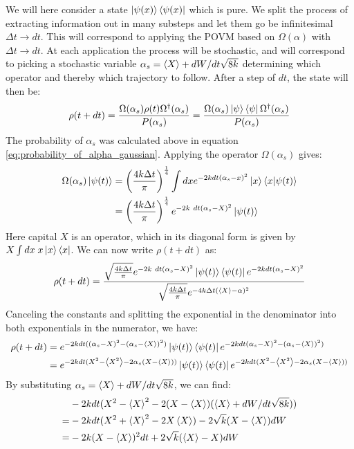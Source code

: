 We will here consider a state $\ket{\psi(x)}\bra{\psi(x)}$ which is pure. We split the process of extracting information out in many substeps and let them go be infinitesimal $\Delta t \to dt$. This will correspond to applying the POVM based on ${\Omega(\alpha)}$ with $\Delta t \to dt$. At each application the process will be stochastic, and will correspond to picking a stochastic variable $\alpha_s =\expval{X} + {dW}/{dt \sqrt{8k}}$ determining which operator and thereby which trajectory to follow. After a step of $dt$, the state will then be:
\begin{equation}
    \rho(t+dt) = \frac{\Omega(\alpha_s) \rho(t)  \Omega^\dagger(\alpha_s)}{P(\alpha_s)} = \frac{\Omega(\alpha_s) \ket{\psi}\bra{\psi}  \Omega^\dagger(\alpha_s)}{P(\alpha_s)} 
\end{equation}
The probability of $\alpha_s$ was calculated above in equation \ref{eq:probability_of_alpha_gaussian}. Applying the operator $\Omega(\alpha_s)$ gives:
\begin{align*}
    \Omega(\alpha_s)\ket{\psi(t)} &=  \left(\frac{4 k \Delta t}{\pi}\right)^\frac14\int dx e^{-2k dt (\alpha_s - x)^2} \ket{x}\bra{x} \ket{\psi(t)} \\
                                  &=  \left(\frac{4 k \Delta t}{\pi}\right)^\frac14 e^{-2k\ dt (\alpha_s - X)^2} \ket{\psi(t)}
\end{align*}
Here capital $X$ is an operator, which in its diagonal form is given by $X \int dx \;x \ket{x}\bra{x}$. We can now write $\rho(t+dt)$ as:
\begin{equation}
    \rho(t + dt) =\frac{\sqrt{\frac{4 k \Delta t}{\pi}}e^{-2k\ dt (\alpha_s - X)^2} \ket{\psi(t)}\bra{\psi(t)}e^{-2k dt (\alpha_s - X)^2}}{\sqrt{\frac{4 k \Delta t}{\pi}}  e^{-4k\Delta t (\expval{X} - \alpha)^2}}    
\end{equation}
Canceling the constants and splitting the exponential in the denominator into both exponentials in the numerator, we have:
\begin{align*}
    \rho(t + dt) &= e^{-2k dt ((\alpha_s - X)^2 - (\alpha_s - \expval{X})^2)} \ket{\psi(t)}\bra{\psi(t)}e^{-2k dt (\alpha_s - X)^2 - (\alpha_s - \expval{X})^2)} \\
            &= e^{-2kdt (X^2 - \expval{X^2} - 2 \alpha_s(X - \expval{X}))}\ket{\psi(t)}\bra{\psi(t)}  e^{-2kdt (X^2 - \expval{X^2} - 2 \alpha_s(X - \expval{X}))}
\end{align*}
By substituting $\alpha_s = \expval{X} + {dW}/{dt \sqrt{8k}}$, we can find:
\begin{align*}
       &-2kdt (X^2 - \expval{X}^2 - 2(X - \expval{X})(\expval{X} + {dW}/{dt \sqrt{8k}})) \\
     = &-2kdt(X^2 + \expval{X}^2 - 2 X \expval{X}) - 2\sqrt{k}(X -\expval{X})dW \\
     = &-2k(X - \expval{X})^2dt + 2\sqrt{k}(\expval{X} - X)dW
\end{align*}
